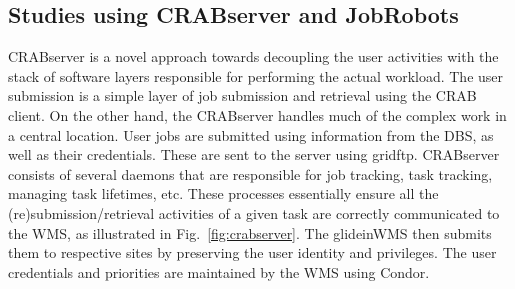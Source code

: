 \documentclass[a4paper]{jpconf}
\begin{document}
\subsection{Studies using CRABserver and JobRobots}
CRABserver is a novel approach towards decoupling the user activities with the stack of software
layers responsible for performing the actual workload. The user submission is a simple layer 
of job submission and retrieval using the CRAB client. On the other hand, the CRABserver handles 
much of the complex work in a central location. User jobs
are submitted using information from the DBS, as well as their credentials.
These are sent to the server using gridftp. CRABserver consists of several daemons that are responsible 
for job tracking, task tracking, managing  task lifetimes, etc. These processes
essentially ensure all the (re)submission/retrieval activities of a given task are correctly communicated
to the WMS, as illustrated in Fig.~\ref{fig:crabserver}. The glideinWMS then submits them to respective sites 
by preserving the user identity and privileges. The user credentials
and priorities are maintained by the WMS using Condor.
\end{document}
